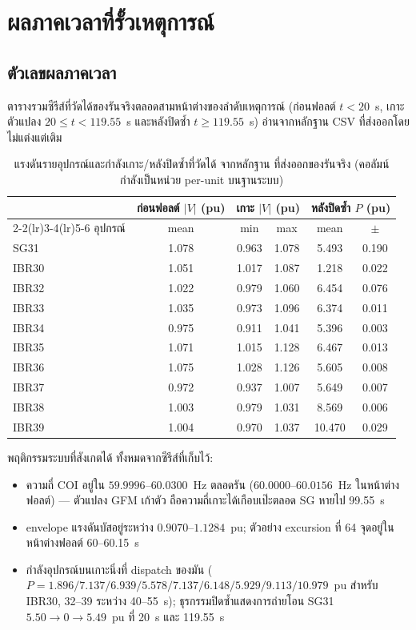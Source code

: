 \documentclass[12pt,a4paper]{article}
\begin{document}
\section{ผลภาคเวลาที่รั้วเหตุการณ์}\label{sec:transient}

\subsection{ตัวเลขผลภาคเวลา}

ตารางรวมซีรีส์ที่วัดได้ของรันจริงตลอดสามหน้าต่างของลำดับเหตุการณ์
(ก่อนฟอลต์ $t<20$~s, เกาะตัวแปลง $20\le t<119.55$~s และหลังปิดซ้ำ
$t\ge119.55$~s) อ่านจากหลักฐาน CSV ที่ส่งออกโดยไม่แต่งแต่เติม

\begin{table}[H]\centering\footnotesize
\caption{แรงดันรายอุปกรณ์และกำลังเกาะ/หลังปิดซ้ำที่วัดได้ จากหลักฐาน
ที่ส่งออกของรันจริง (คอลัมน์กำลังเป็นหน่วย per-unit บนฐานระบบ)}
\label{tab:tsstats}
\begin{tabular}{lccccc}
\toprule
& \multicolumn{1}{c}{ก่อนฟอลต์ $|V|$ (pu)} &
\multicolumn{2}{c}{เกาะ $|V|$ (pu)} &
\multicolumn{2}{c}{หลังปิดซ้ำ $P$ (pu)}\\
\cmidrule(lr){2-2}\cmidrule(lr){3-4}\cmidrule(lr){5-6}
อุปกรณ์ & mean & min & max & mean & $\pm$\\
\midrule
SG31   & 1.078 & 0.963 & 1.078 & 5.493 & 0.190\\
IBR30  & 1.051 & 1.017 & 1.087 & 1.218 & 0.022\\
IBR32  & 1.022 & 0.979 & 1.060 & 6.454 & 0.076\\
IBR33  & 1.035 & 0.973 & 1.096 & 6.374 & 0.011\\
IBR34  & 0.975 & 0.911 & 1.041 & 5.396 & 0.003\\
IBR35  & 1.071 & 1.015 & 1.128 & 6.467 & 0.013\\
IBR36  & 1.075 & 1.028 & 1.126 & 5.605 & 0.008\\
IBR37  & 0.972 & 0.937 & 1.007 & 5.649 & 0.007\\
IBR38  & 1.003 & 0.979 & 1.031 & 8.569 & 0.006\\
IBR39  & 1.004 & 0.970 & 1.037 & 10.470 & 0.029\\
\bottomrule
\end{tabular}
\end{table}

พฤติกรรมระบบที่สังเกตได้ ทั้งหมดจากซีรีส์ที่เก็บไว้:
\begin{itemize}
\item ความถี่ COI อยู่ใน $59.9996$--$60.0300$~Hz ตลอดรัน
      ($60.0000$--$60.0156$~Hz ในหน้าต่างฟอลต์) --- ตัวแปลง GFM เก้าตัว
      ถือความถี่เกาะได้เกือบเป๊ะตลอด SG หายไป 99.55~s
\item envelope แรงดันบัสอยู่ระหว่าง $0.9070$--$1.1284$~pu;
      ตัวอย่าง excursion ที่ 64 จุดอยู่ในหน้าต่างฟอลต์ 60--60.15~s
\item กำลังอุปกรณ์บนเกาะนิ่งที่ dispatch ของมัน
      ($P=1.896/7.137/6.939/5.578/7.137/6.148/5.929/9.113/10.979$~pu
      สำหรับ IBR30, 32--39 ระหว่าง 40--55~s);
      ธุรกรรมปิดซ้ำแสดงการถ่ายโอน SG31 $5.50\to0\to5.49$~pu ที่ 20~s และ 119.55~s
\end{itemize}
\end{document}
